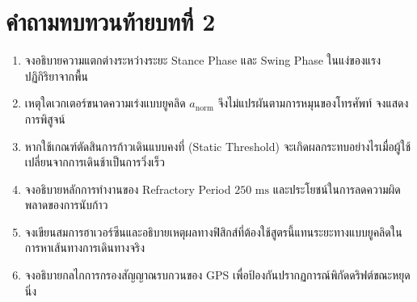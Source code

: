 \section*{คำถามทบทวนท้ายบทที่ 2}
\begin{enumerate}
    \item จงอธิบายความแตกต่างระหว่างระยะ Stance Phase และ Swing Phase ในแง่ของแรงปฏิกิริยาจากพื้น
    \item เหตุใดเวกเตอร์ขนาดความเร่งแบบยูคลิด $a_{\text{norm}}$ จึงไม่แปรผันตามการหมุนของโทรศัพท์ จงแสดงการพิสูจน์
    \item หากใช้เกณฑ์ตัดสินการก้าวเดินแบบคงที่ (Static Threshold) จะเกิดผลกระทบอย่างไรเมื่อผู้ใช้เปลี่ยนจากการเดินช้าเป็นการวิ่งเร็ว
    \item จงอธิบายหลักการทำงานของ Refractory Period $250\text{ ms}$ และประโยชน์ในการลดความผิดพลาดของการนับก้าว
    \item จงเขียนสมการฮาเวอร์ซีนและอธิบายเหตุผลทางฟิสิกส์ที่ต้องใช้สูตรนี้แทนระยะทางแบบยูคลิดในการหาเส้นทางการเดินทางจริง
    \item จงอธิบายกลไกการกรองสัญญาณรบกวนของ GPS เพื่อป้องกันปรากฏการณ์พิกัดดริฟต์ขณะหยุดนิ่ง
\end{enumerate}
\clearpage
